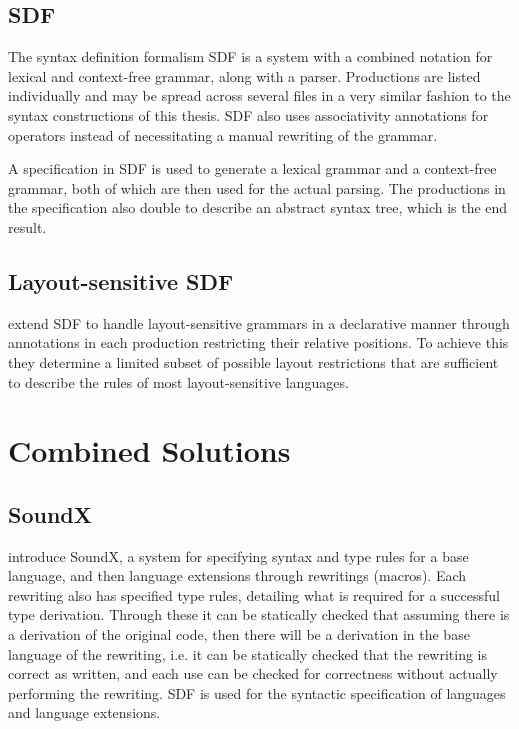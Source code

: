\documentclass{kththesis}
\begin{document}
\subsection{SDF}

The syntax definition formalism SDF \cite{Heering1989} is a system with a combined notation for lexical and context-free grammar, along with a parser. Productions are listed individually and may be spread across several files in a very similar fashion to the syntax constructions of this thesis. SDF also uses associativity annotations for operators instead of necessitating a manual rewriting of the grammar.

A specification in SDF is used to generate a lexical grammar and a context-free grammar, both of which are then used for the actual parsing. The productions in the specification also double to describe an abstract syntax tree, which is the end result.

\subsection{Layout-sensitive SDF}

\textcite{Erdweg2013} extend SDF to handle layout-sensitive grammars in a declarative manner through annotations in each production restricting their relative positions. To achieve this they determine a limited subset of possible layout restrictions that are sufficient to describe the rules of most layout-sensitive languages.

\section{Combined Solutions} \label{sec:full-solutions}

\subsection{SoundX}

\textcite{Lorenzen2016} introduce SoundX, a system for specifying syntax and type rules for a base language, and then language extensions through rewritings (macros). Each rewriting also has specified type rules, detailing what is required for a successful type derivation. Through these it can be statically checked that assuming there is a derivation of the original code, then there will be a derivation in the base language of the rewriting, i.e. it can be statically checked that the rewriting is correct as written, and each use can be checked for correctness without actually performing the rewriting. SDF is used for the syntactic specification of languages and language extensions.
\end{document}
